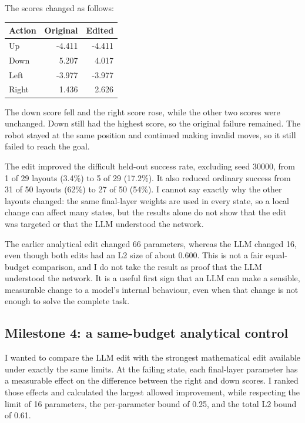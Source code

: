 \documentclass[11pt,a4paper]{article}
\begin{document}
The scores changed as follows:

\begin{center}
\begin{tabular}{lrr}
Action & Original & Edited \\
\hline
Up & -4.411 & -4.411 \\
Down & 5.207 & 4.017 \\
Left & -3.977 & -3.977 \\
Right & 1.436 & 2.626 \\
\end{tabular}
\end{center}

The down score fell and the right score rose, while the other two scores were unchanged. Down still had the highest score, so the original failure remained. The robot stayed at the same position and continued making invalid moves, so it still failed to reach the goal.

The edit improved the difficult held-out success rate, excluding seed 30000, from 1 of 29 layouts (3.4\%) to 5 of 29 (17.2\%). It also reduced ordinary success from 31 of 50 layouts (62\%) to 27 of 50 (54\%). I cannot say exactly why the other layouts changed: the same final-layer weights are used in every state, so a local change can affect many states, but the results alone do not show that the edit was targeted or that the LLM understood the network.

The earlier analytical edit changed 66 parameters, whereas the LLM changed 16, even though both edits had an L2 size of about 0.600. This is not a fair equal-budget comparison, and I do not take the result as proof that the LLM understood the network. It is a useful first sign that an LLM can make a sensible, measurable change to a model's internal behaviour, even when that change is not enough to solve the complete task.

\subsection*{Milestone 4: a same-budget analytical control}

I wanted to compare the LLM edit with the strongest mathematical edit available under exactly the same limits. At the failing state, each final-layer parameter has a measurable effect on the difference between the right and down scores. I ranked those effects and calculated the largest allowed improvement, while respecting the limit of 16 parameters, the per-parameter bound of 0.25, and the total L2 bound of 0.61.
\end{document}
